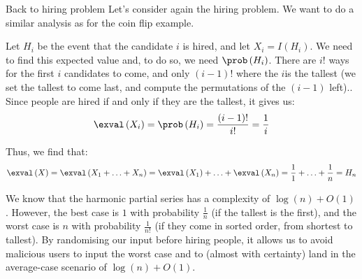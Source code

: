 \documentclass[a4paper]{article}
\begin{document}
\begin{parag}{Back to hiring problem}
    Let's consider again the hiring problem. We want to do a similar analysis as for the coin flip example.

    Let $H_i$ be the event that the candidate $i$ is hired, and let $X_i = I\left(H_i\right)$. We need to find this expected value and, to do so, we need $\prob\left(H_i\right)$. There are $i!$ ways for the first $i$ candidates to come, and only $\left(i-1\right)!$ where the $i$\Th is the tallest (we set the tallest to come last, and compute the permutations of the $\left(i-1\right)$ left).. Since people are hired if and only if they are the tallest, it gives us: 
    \[\exval\left(X_i\right) = \prob\left(H_i\right) = \frac{\left(i-1\right)!}{i!} = \frac{1}{i}\]
    
    Thus, we find that: 
    \[\exval\left(X\right) = \exval\left(X_1 + \ldots + X_n\right) = \exval\left(X_1\right) + \ldots + \exval\left(X_n\right) = \frac{1}{1} + \ldots + \frac{1}{n} = H_n\]
    
    We know that the harmonic partial series has a complexity of $\log\left(n\right) + O\left(1\right)$. However, the best case is $1$ with probability $\frac{1}{n}$ (if the tallest is the first), and the worst case is $n$ with probability $\frac{1}{n!}$ (if they come in sorted order, from shortest to tallest). By randomising our input before hiring people, it allows us to avoid malicious users to input the worst case and to (almost with certainty) land in the average-case scenario of $\log\left(n\right) + O\left(1\right)$.
\end{parag}
\end{document}
